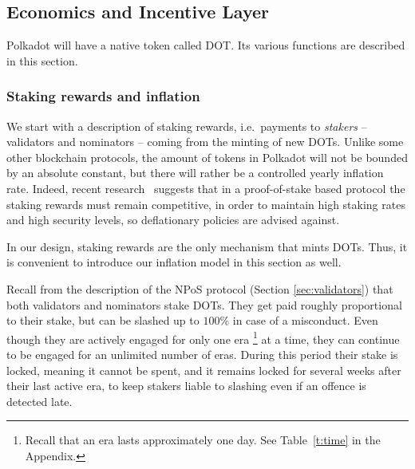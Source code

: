 \subsection{Economics and Incentive Layer}\label{sec:economics}

Polkadot will have a native token called DOT. Its various functions are described in this section.


\subsubsection{Staking rewards and inflation}\label{sec:inflation}

We start with a description of staking rewards, i.e.~payments to \emph{stakers} -- validators and nominators -- 
coming from the minting of new DOTs. 
Unlike some other blockchain protocols, the amount of tokens in Polkadot will not be bounded by an absolute constant, but there will rather be a controlled yearly inflation rate. Indeed, recent research~\cite{chitra2019competitive} suggests that in a proof-of-stake based protocol the staking rewards must remain competitive, in order to maintain high staking rates and high security levels, so deflationary policies are advised against. 

In our design, staking rewards are the only mechanism that mints DOTs. 
Thus, it is convenient to introduce our inflation model in this section as well. 

Recall from the description of the NPoS protocol (Section \ref{sec:validators}) that both validators and nominators stake DOTs. 
They get paid roughly proportional to their stake, but can be slashed up to $100\%$ in case of a misconduct. 
Even though they are actively engaged for only one era%
\footnote{Recall that an era lasts approximately one day. See Table~\ref{t:time} in the Appendix.} 
at a time, they can continue to be engaged for an unlimited number of eras. 
During this period their stake is locked, meaning it cannot be spent, and it remains locked for several weeks after their last active era, to keep stakers liable to slashing even if an offence is detected late.

